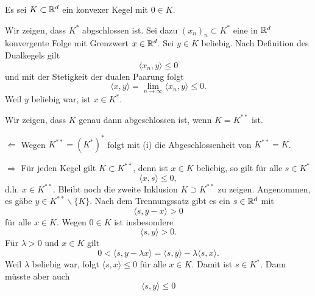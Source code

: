 
Es sei $K\subset \mathbb{R}^d$ ein konvexer Kegel mit $0\in K$.
\\
\begin{compactenum}[(i)]
 \item Wir zeigen, dass $K^*$ abgschlossen ist. Sei dazu $(x_n)_n\subset K^*$ eine in $\mathbb{R}^d$ konvergente
 Folge mit Grenzwert $x\in\mathbb{R}^d$. Sei $y\in K$ beliebig. Nach Definition des Dualkegels gilt 
 \begin{displaymath}
  \langle x_n,y\rangle\leq 0
 \end{displaymath}
 und mit der Stetigkeit der dualen Paarung folgt
 \begin{displaymath}
  \langle x, y\rangle =\lim_{n\to\infty}\langle x_n,y\rangle\leq 0.
 \end{displaymath} 
 Weil $y$ beliebig war, ist $x\in K^*$.
 \\
 \item Wir zeigen, dass $K$ genau dann abgeschlossen ist, wenn $K=K^{**}$ ist.
 \begin{compactenum}
 \item[$\Leftarrow$] Wegen $K^{**}=(K^*)^*$ folgt mit (i) die Abgeschlossenheit von $K^{**}=K$.
 \item[$\Rightarrow$] Für jeden Kegel gilt $K\subset K^{**}$, denn ist $x\in K$ beliebig,
 so gilt für alle $s\in K^*$
 \begin{displaymath}
    \langle x,s\rangle\leq 0,
 \end{displaymath}
 d.h. $x\in K^{**}$. Bleibt noch die zweite Inklusion $K\supset K^{**}$ zu zeigen. Angenommen, es gäbe
 $y\in K^{**}\backslash\{K\}$. Nach dem Trennungssatz gibt es ein $s\in \mathbb{R}^d$ mit 
 \begin{displaymath}
  \langle s, y-x\rangle > 0
 \end{displaymath}
 für alle $x\in K$. Wegen $0\in K$ ist insbesondere
 \begin{displaymath}
  \langle s,y\rangle >0.
 \end{displaymath}
 Für $\lambda>0$ und $x\in K$ gilt 
 \begin{displaymath}
  0<\langle s, y-\lambda x\rangle=\langle s, y\rangle-\lambda\langle s, x\rangle.
 \end{displaymath}
 Weil $\lambda$ beliebig war, folgt $\langle s, x\rangle\leq 0$ für alle $x\in K$. 
 Damit ist $s\in K^*$. Dann müsste aber auch
 \begin{displaymath}
  \langle s,y\rangle \leq 0
 \end{displaymath}

\end{compactenum}
\end{compactenum}
